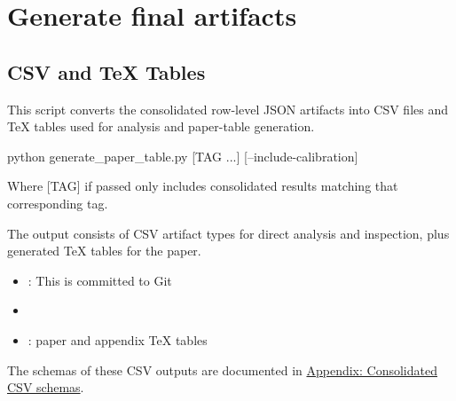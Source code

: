 \documentclass[11pt]{article}
\begin{document}
\section{Generate final artifacts}
\subsection{CSV and TeX Tables}
This script converts the consolidated row-level JSON artifacts into CSV files and TeX tables used for analysis and paper-table generation.
\begin{DocCode}
python generate_paper_table.py [TAG ...] [--include-calibration]
\end{DocCode}
Where [TAG] if passed only includes consolidated results matching that corresponding tag.

The output consists of CSV artifact types for direct analysis and inspection, plus generated TeX tables for the paper.
\begin{itemize}
  \item {}: This is committed to Git
  \item {}
  \item {}: paper and appendix TeX tables
\end{itemize}

The schemas of these CSV outputs are documented in \hyperref[sec:experiment-plan-consolidated-csv-schema-appendix]{Appendix: Consolidated CSV schemas}.

\FloatBarrier
\end{document}
